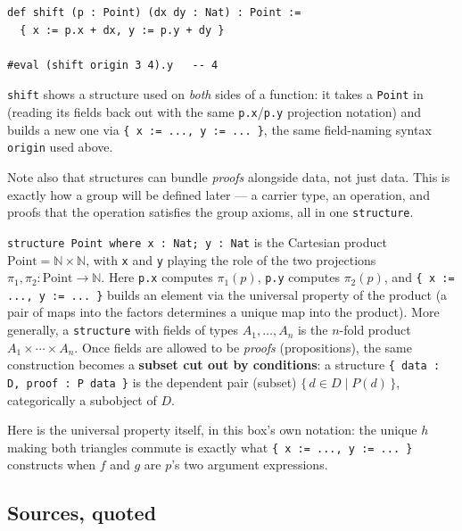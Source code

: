 \begin{lstlisting}
def shift (p : Point) (dx dy : Nat) : Point :=
  { x := p.x + dx, y := p.y + dy }

#eval (shift origin 3 4).y   -- 4
\end{lstlisting}

\texttt{shift} shows a structure used on \emph{both} sides of a function: it takes a \texttt{Point} in (reading its fields back out with the same \texttt{p.x}/\texttt{p.y} projection notation) and builds a new one via \texttt{\{ x := ..., y := ... \}}, the same field-naming syntax \texttt{origin} used above.

Note also that structures can bundle \emph{proofs} alongside data, not just data. This is exactly how a group will be defined later --- a carrier type, an operation, and proofs that the operation satisfies the group axioms, all in one \texttt{structure}.

\begin{mathreading}

\texttt{structure Point where x : Nat; y : Nat} is the Cartesian product \(\mathrm{Point} = \mathbb{N} \times \mathbb{N}\), with \texttt{x} and \texttt{y} playing the role of the two projections \(\pi_1, \pi_2 : \mathrm{Point} \to \mathbb{N}\). Here \texttt{p.x} computes \(\pi_1(p)\), \texttt{p.y} computes \(\pi_2(p)\), and \texttt{\{ x := ..., y := ... \}} builds an element via the universal property of the product (a pair of maps into the factors determines a unique map into the product). More generally, a \texttt{structure} with fields of types \(A_1, \ldots, A_n\) is the \(n\)-fold product \(A_1 \times \cdots \times A_n\). Once fields are allowed to be \emph{proofs} (propositions), the same construction becomes a \textbf{subset cut out by conditions}: a structure \texttt{\{ data : D, proof : P data \}} is the dependent pair (subset) \(\{\, d \in D \mid P(d) \,\}\), categorically a subobject of \(D\).

\end{mathreading}

Here is the universal property itself, in this box's own notation: the unique \(h\) making both triangles commute is exactly what \texttt{\{ x := ..., y := ... \}} constructs when \(f\) and \(g\) are \(p\)'s two argument expressions.

\begin{center}

\end{center}

\subsection{Sources, quoted}\label{sec:02-functions-and-structures:01-structure-basics:2}

